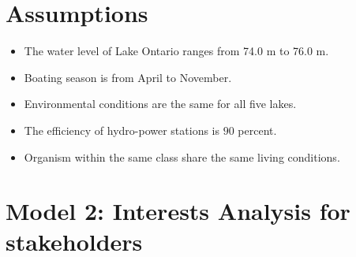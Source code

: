 \documentclass[pre,12pt]{revtex4-1}
\begin{document}
\newpage

\section{Assumptions}
\begin{itemize}
    \item The water level of Lake Ontario ranges from 74.0 m to 76.0 m. 
    \item Boating season is from April to November.
    \item Environmental conditions are the same for all five lakes.
    \item The efficiency of hydro-power stations is $90$ percent.
    \item Organism within the same class share the same living conditions. 
\end{itemize}

\section{Model 2: Interests Analysis for stakeholders}\label{Model}
\end{document}
